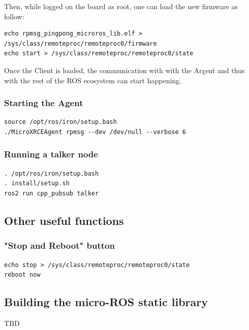 \documentclass[10pt]{article}
\begin{document}
Then, while logged on the board as root, one can load the new firmware as
follow:
\begin{verbatim}
echo rpmsg_pingpong_microros_lib.elf > /sys/class/remoteproc/remoteproc0/firmware
echo start > /sys/class/remoteproc/remoteproc0/state
\end{verbatim}

Once the Client is loaded, the communication with with the Argent and thus with
the rest of the ROS ecosystem can start happening.

\subsubsection{Starting the Agent}
\label{sec:org71eb6cd}
\begin{verbatim}
source /opt/ros/iron/setup.bash
./MicroXRCEAgent rpmsg --dev /dev/null --verbose 6
\end{verbatim}

\subsubsection{Running a talker node}
\label{sec:orgfe88931}
\begin{verbatim}
. /opt/ros/iron/setup.bash
. install/setup.sh
ros2 run cpp_pubsub talker
\end{verbatim}

\subsection{Other useful functions}
\label{sec:org4bffa71}
\subsubsection{"Stop and Reboot" button}
\label{sec:org4ac0818}
\begin{verbatim}
echo stop > /sys/class/remoteproc/remoteproc0/state
reboot now
\end{verbatim}

\subsection{Building the micro-ROS static library}
\label{sec:orgce05a9b}
TBD
\clearpage
\end{document}
